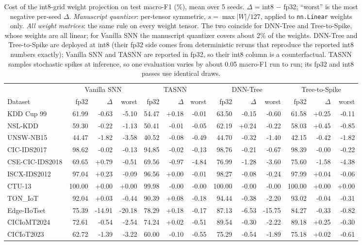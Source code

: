 \begin{table}[t]
\centering
\scriptsize
\caption{Cost of the int8-grid weight projection on test macro-F1 (\%), mean over 5 seeds. $\Delta$ = int8 $-$ fp32; ``worst'' is the most negative per-seed $\Delta$. \emph{Manuscript quantizer}: per-tensor symmetric, $s=\max|W|/127$, applied to \texttt{nn.Linear} weights only. \emph{All weight matrices}: the same rule on every weight tensor. The two coincide for DNN-Tree and Tree-to-Spike, whose weights are all linear; for Vanilla SNN the manuscript quantizer covers about 2\% of the weights. DNN-Tree and Tree-to-Spike are deployed at int8 (their fp32 side comes from deterministic reruns that reproduce the reported int8 numbers exactly); Vanilla SNN and TASNN are reported in fp32, so their int8 column is a counterfactual. TASNN samples stochastic spikes at inference, so one evaluation varies by about 0.05 macro-F1 run to run; its fp32 and int8 passes use identical draws.}
\label{tab:m3:quant}
\begin{tabular}{lrrrrrrrrrrrr}
\toprule
 & \multicolumn{3}{c}{Vanilla SNN} & \multicolumn{3}{c}{TASNN} & \multicolumn{3}{c}{DNN-Tree} & \multicolumn{3}{c}{Tree-to-Spike} \\
\cmidrule(lr){2-4}\cmidrule(lr){5-7}\cmidrule(lr){8-10}\cmidrule(lr){11-13}
Dataset & fp32 & $\Delta$ & worst & fp32 & $\Delta$ & worst & fp32 & $\Delta$ & worst & fp32 & $\Delta$ & worst \\
\midrule
KDD Cup 99 & 61.99 & -0.63 & -5.10 & 54.47 & +0.18 & -0.01 & 63.50 & -0.15 & -0.60 & 61.58 & +0.25 & -0.11 \\
NSL-KDD & 59.30 & -0.22 & -1.13 & 50.41 & -0.01 & -0.05 & 62.19 & +0.24 & -0.22 & 58.03 & +0.45 & -0.85 \\
UNSW-NB15 & 44.47 & -1.82 & -3.58 & 40.52 & -0.08 & -0.49 & 44.70 & -0.32 & -1.40 & 42.15 & -0.42 & -1.82 \\
CIC-IDS2017 & 98.62 & -0.02 & -0.13 & 94.85 & -0.02 & -0.13 & 98.76 & -0.21 & -0.67 & 98.39 & -0.00 & -0.22 \\
CSE-CIC-IDS2018 & 69.65 & +0.79 & -0.51 & 69.56 & -0.97 & -4.84 & 76.99 & -1.28 & -3.60 & 75.60 & -1.58 & -4.38 \\
ISCX-IDS2012 & 97.04 & +0.23 & -0.09 & 96.56 & +0.00 & -0.01 & 98.27 & -0.08 & -0.24 & 97.99 & +0.04 & -0.06 \\
CTU-13 & 100.00 & +0.00 & +0.00 & 99.98 & -0.00 & -0.00 & 100.00 & -0.00 & -0.00 & 100.00 & +0.00 & +0.00 \\
TON\_IoT & 92.04 & +0.03 & -0.44 & 90.39 & +0.08 & -0.18 & 94.44 & -0.38 & -2.20 & 93.02 & -0.04 & -0.31 \\
Edge-IIoTset & 75.39 & -14.91 & -20.18 & 78.29 & +0.18 & -0.17 & 87.13 & -6.53 & -15.75 & 84.27 & -0.33 & -0.82 \\
CICIoMT2024 & 72.61 & -0.54 & -2.54 & 74.24 & +0.02 & -0.51 & 89.54 & -0.30 & -2.22 & 89.18 & +0.25 & -0.30 \\
CICIoT2023 & 62.72 & -1.39 & -3.22 & 60.00 & -0.10 & -0.55 & 75.29 & -0.54 & -1.89 & 75.18 & +0.02 & -0.61 \\
\bottomrule
\end{tabular}
\end{table}
